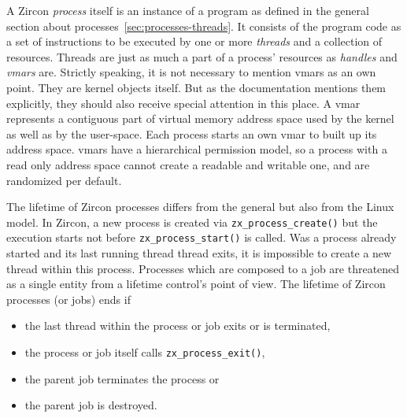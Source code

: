 A Zircon \textit{process} itself is an instance of a program as defined in the general section about processes~\ref{sec:processes-threads}.
It consists of the program code as a set of instructions to be executed by one or more \textit{threads} and a collection of resources.
Threads are just as much a part of a process' resources as \textit{handles} and \textit{\acp{vmar}} are\cite{zircon-process}.
Strictly speaking, it is not necessary to mention \acp{vmar} as an own point.
They are kernel objects itself.
But as the documentation mentions them explicitly, they should also receive special attention in this place.
A \ac{vmar} represents a contiguous part of virtual memory address space used by the kernel as well as by the user-space. 
Each process starts an own \ac{vmar} to built up its address space.
\acp{vmar} have a hierarchical permission model, so a process with a read only address space cannot create a readable and writable one, and are randomized per default\cite{zircon-vmar}.

The lifetime of Zircon processes differs from the general but also from the Linux model.
In Zircon, a new process is created via \texttt{zx\_process\_create()} but the execution starts not before \texttt{zx\_process\_start()} is called.
Was a process already started and its last running thread thread exits, it is impossible to create a new thread within this process.
Processes which are composed to a job are threatened as a single entity from a lifetime control's point of view.
The lifetime of Zircon processes (or jobs) ends if 
\begin{itemize}
    \item the last thread within the process or job exits or is terminated,
    \item the process or job itself calls \texttt{zx\_process\_exit()},
    \item the parent job terminates the process or
    \item the parent job is destroyed\cite{zircon-process}.
\end{itemize}

